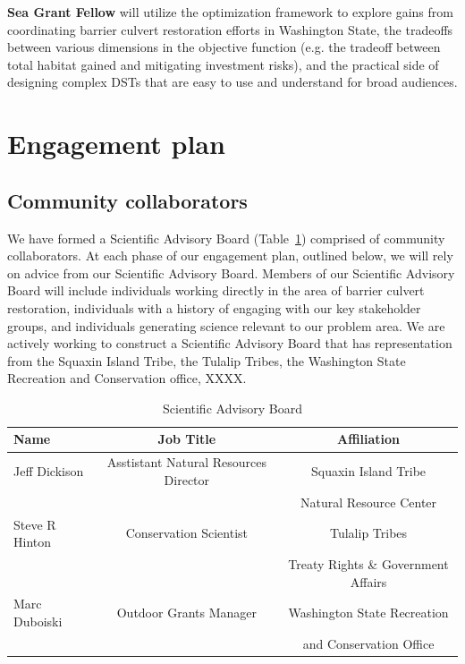 \documentclass[12pt]{elsarticle}
\begin{document}
\textbf{Sea Grant Fellow} will utilize the optimization framework to explore gains from coordinating barrier culvert restoration efforts in Washington State, the tradeoffs between various dimensions in the objective function (e.g. the tradeoff between total habitat gained and mitigating investment risks), and the practical side of designing complex DSTs that are easy to use and understand for broad audiences. \\



%
\section{Engagement plan \label{sec:engage}}

\subsection{Community collaborators} 

We have formed a Scientific Advisory Board (Table~\ref{tab:sab}) comprised of community collaborators. At each phase of our engagement plan, outlined below, we will rely on advice from our Scientific Advisory Board. Members of our Scientific Advisory Board will include individuals working directly in the area of barrier culvert restoration, individuals with a history of engaging with our key stakeholder groups, and individuals generating science relevant to our problem area. We are actively working to construct a Scientific Advisory Board that has representation from the Squaxin Island Tribe, the Tulalip Tribes, the Washington State Recreation and Conservation office, XXXX.

\begin{table}[h]
\caption{Scientific Advisory Board \label{tab:sab}}
\centering
\begin{tabular}{lcc}\hline
 Name & Job Title & Affiliation  \\\hline
Jeff Dickison& Asstistant Natural Resources Director &  Squaxin Island Tribe\\
& & Natural Resource Center\\
\rowcolor[gray]{.9} Steve R Hinton &  Conservation Scientist&  Tulalip Tribes  \\
\rowcolor[gray]{.9}& &Treaty Rights \& Government Affairs\\
Marc Duboiski & Outdoor Grants Manager & Washington State Recreation\\
& & and Conservation Office\\\hline
\end{tabular}
\end{table}
\end{document}

